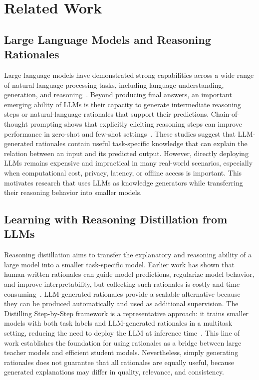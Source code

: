 \documentclass[11pt]{article}
\begin{document}
\section{Related Work}
\label{sec:related-work}

\subsection{Large Language Models and Reasoning Rationales}

Large language models have demonstrated strong capabilities across a wide range of natural language processing tasks, including language understanding, generation, and reasoning~\cite{brown2020language,chowdhery2022palm,openai2023gpt4}. Beyond producing final answers, an important emerging ability of LLMs is their capacity to generate intermediate reasoning steps or natural-language rationales that support their predictions. Chain-of-thought prompting shows that explicitly eliciting reasoning steps can improve performance in zero-shot and few-shot settings~\cite{wei2022chain,kojima2022large}. These studies suggest that LLM-generated rationales contain useful task-specific knowledge that can explain the relation between an input and its predicted output. However, directly deploying LLMs remains expensive and impractical in many real-world scenarios, especially when computational cost, privacy, latency, or offline access is important. This motivates research that uses LLMs as knowledge generators while transferring their reasoning behavior into smaller models.

\subsection{Learning with Reasoning Distillation from LLMs}

Reasoning distillation aims to transfer the explanatory and reasoning ability of a large model into a smaller task-specific model. Earlier work has shown that human-written rationales can guide model predictions, regularize model behavior, and improve interpretability, but collecting such rationales is costly and time-consuming~\cite{zaidan2007using,camburu2018esnli,rajani2019cosmos}. LLM-generated rationales provide a scalable alternative because they can be produced automatically and used as additional supervision. The Distilling Step-by-Step framework is a representative approach: it trains smaller models with both task labels and LLM-generated rationales in a multitask setting, reducing the need to deploy the LLM at inference time~\cite{hsieh2023distilling}. This line of work establishes the foundation for using rationales as a bridge between large teacher models and efficient student models. Nevertheless, simply generating rationales does not guarantee that all rationales are equally useful, because generated explanations may differ in quality, relevance, and consistency.
\end{document}
